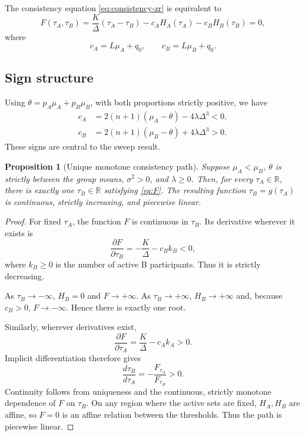 \documentclass[11pt,a4paper]{article}
\newtheorem{proposition}{Proposition}
\newcommand{\R}{\mathbb{R}}
\newcommand{\1}{\mathbf{1}}
\begin{document}
The consistency equation \eqref{eq:consistency-zr} is equivalent to
\begin{equation}
  \boxed{
  F(\tau_A,\tau_B)
  =
  \frac K\Delta(\tau_A-\tau_B)
  -c_AH_A(\tau_A)-c_BH_B(\tau_B)=0,
  }
  \label{eq:F}
\end{equation}
where
\begin{equation}
  c_A=L\mu_A+q_0,
  \qquad
  c_B=L\mu_B+q_0.
\end{equation}

\subsection{Sign structure}

Using \(\theta=p_A\mu_A+p_B\mu_B\), with both proportions strictly
positive, we have
\begin{align}
  c_A
  &=2(n+1)(\mu_A-\theta)-4\lambda\Delta^3<0,
  \label{eq:cA-sign}\\
  c_B
  &=2(n+1)(\mu_B-\theta)+4\lambda\Delta^3>0.
  \label{eq:cB-sign}
\end{align}
These signs are central to the sweep result.

\begin{proposition}[Unique monotone consistency path]
Suppose \(\mu_A<\mu_B\), \(\theta\) is strictly between the group means,
\(\sigma^2>0\), and \(\lambda\geq0\). Then, for every
\(\tau_A\in\R\), there is exactly one \(\tau_B\in\R\) satisfying
\eqref{eq:F}. The resulting function
\(\tau_B=g(\tau_A)\) is continuous, strictly increasing, and
piecewise linear.
\end{proposition}

\begin{proof}
For fixed \(\tau_A\), the function \(F\) is continuous in \(\tau_B\).
Its derivative wherever it exists is
\[
  \frac{\partial F}{\partial\tau_B}
  =-\frac K\Delta-c_B k_B<0,
\]
where \(k_B\geq0\) is the number of active B participants. Thus it is
strictly decreasing.

As \(\tau_B\to-\infty\), \(H_B=0\) and
\(F\to+\infty\). As \(\tau_B\to+\infty\), \(H_B\to+\infty\) and,
because \(c_B>0\), \(F\to-\infty\). Hence there is exactly one root.

Similarly, wherever derivatives exist,
\[
  \frac{\partial F}{\partial\tau_A}
  =\frac K\Delta-c_Ak_A>0.
\]
Implicit differentiation therefore gives
\[
  \frac{d\tau_B}{d\tau_A}
  =-\frac{F_{\tau_A}}{F_{\tau_B}}>0.
\]
Continuity follows from uniqueness and the continuous, strictly
monotone dependence of \(F\) on \(\tau_B\). On any region where the
active sets are fixed, \(H_A,H_B\) are affine, so \(F=0\) is an affine
relation between the thresholds. Thus the path is piecewise linear.
\end{proof}
\end{document}
